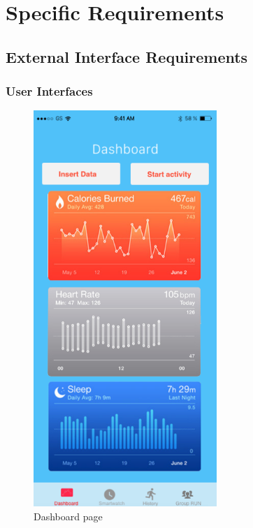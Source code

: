 \documentclass{article}
\begin{document}
\newpage
\section{Specific Requirements}

\subsection{External Interface Requirements}

	\subsubsection{User Interfaces} 	
	\begin{figure}[!h]
	 	\centering
		\includegraphics[height=15cm,keepaspectratio]{Figures/Screen05}
		\caption{Dashboard page}
	\end{figure}\newpage
\end{document}

